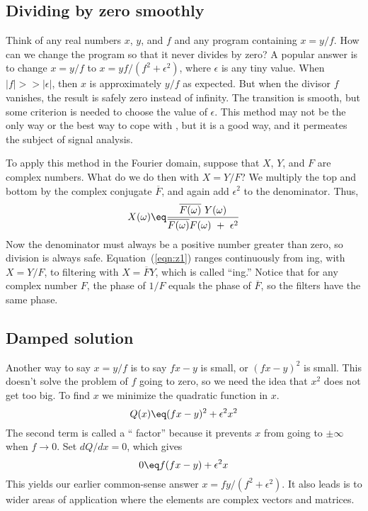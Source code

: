 \subsection{Dividing by zero smoothly}
Think of any real numbers $x$, $y$, and $f$ and any
program containing $x=y/f$.
How can we change the program so that it never divides by zero?
A popular answer is to change $x=y/f$
to $x=yf/(f^2+\epsilon^2)$, where $\epsilon$ is any tiny value.
When $|f| >> |\epsilon|$,
then $x$ is approximately $y/f$ as expected.
But when the divisor $f$ vanishes,
the result is safely zero instead of infinity.
The transition is smooth,
but some criterion is needed to choose the value of $\epsilon$.
This method may not be the only way or the best way
to cope with
,
but it is a good way,
and it permeates the subject of signal analysis.
\par
To apply this method in the Fourier domain,
suppose that $X$, $Y$, and $F$ are complex numbers.
What do we do then with $X=Y/F$?
We multiply the
top and bottom by the complex conjugate $\overline{F}$,
and again add $\epsilon^2$ to the denominator.
Thus,
\begin{equation}
X(\omega) \eq
\frac{ \overline{F(\omega)} \ Y(\omega)  }{ \overline{F(\omega)} F(\omega) \ +\ \epsilon^2}
\label{eqn:z1}
\end{equation}
Now the denominator must always be a positive number greater than zero,
so division is always safe.
Equation~(\ref{eqn:z1}) ranges continuously from
ing, with
$X=Y/F$, to filtering with $X=\overline{F}Y$,
which is called ``ing.''
Notice that for any complex number $F$,
the phase of $1/F$ equals the phase of $\overline{F}$,
so the filters 
have the same phase.
%
\subsection{Damped solution}
Another way to say $x=y/f$ is to say $fx-y$ is small, or $(fx-y)^2$ is small.
This doesn't solve the problem of $f$ going to zero,
so we need the idea that $x^2$ does not get too big.
To find $x$ we minimize the quadratic function in $x$.
\begin{equation}
Q(x) \eq (f x-y)^2 + \epsilon^2 x^2
\label{eqn:z2}
\end{equation}
The second term is called a `` factor''
because it prevents $x$ from going to $\pm \infty$ when $f\rightarrow 0$.
Set $dQ/dx=0$, which gives
\begin{equation}
0 \eq f(f x-y) + \epsilon^2 x
\label{eqn:z3}
\end{equation}
This yields our earlier common-sense answer $x=fy/(f^2+\epsilon^2)$.
It also leads is to wider areas of application where the elements are complex
vectors and matrices.

